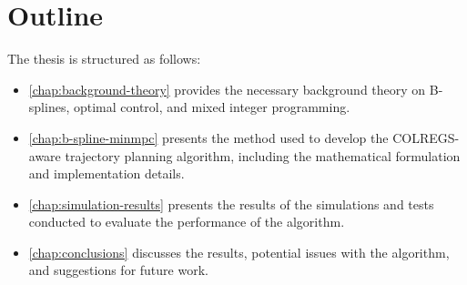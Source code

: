 \section{Outline}
The thesis is structured as follows:
\begin{itemize}
    \item \cref{chap:background-theory} provides the necessary background theory on B-splines, optimal control, and mixed integer programming.
    \item \cref{chap:b-spline-minmpc} presents the method used to develop the COLREGS-aware trajectory planning algorithm, including the mathematical formulation and implementation details.
    \item \cref{chap:simulation-results} presents the results of the simulations and tests conducted to evaluate the performance of the algorithm.
    \item \cref{chap:conclusions} discusses the results, potential issues with the algorithm, and suggestions for future work.
\end{itemize}